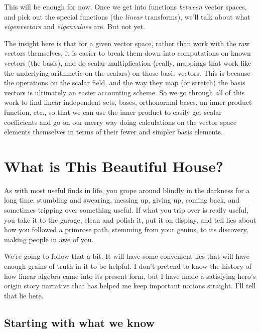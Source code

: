 \documentclass[
]{book}
\begin{document}
This will be enough for now. Once we get into functions \emph{between} vector spaces, and pick out the special functions (the \emph{linear} transforms), we'll talk about what \emph{eigenvectors} and \emph{eigenvalues} are. But not yet.

The insight here is that for a given vector space, rather than work with the raw vectors themselves, it is easier to break them down into computations on known vectors (the basis), and do scalar multiplication (really, mappings that work like the underlying arithmetic on the scalars) on those basis vectors. This is because the operations on the scalar field, and the way they map (or stretch) the basis vectors is ultimately an easier accounting scheme. So we go through all of this work to find linear independent sets, bases, orthonormal bases, an inner product function, etc., so that we can use the inner product to easily get scalar coefficients and go on our merry way doing calculations on the vector space elements themselves in terms of their fewer and simpler basis elements.

\hypertarget{what-is-this-beautiful-house}{%
\chapter{What is This Beautiful House?}\label{what-is-this-beautiful-house}}

As with most useful finds in life, you grope around blindly in the darkness for a long time, stumbling and swearing, messing up, giving up, coming back, and sometimes tripping over something useful. If what you trip over is really useful, you take it to the garage, clean and polish it, put it on display, and tell lies about how you followed a primrose path, stemming from your genius, to its discovery, making people in awe of you.

We're going to follow that a bit. It will have some convenient lies that will have enough grains of truth in it to be helpful. I don't pretend to know the history of how linear algebra came into its present form, but I have made a satisfying hero's origin story narrative that has helped me keep important notions straight. I'll tell that lie here.

\hypertarget{starting-with-what-we-know}{%
\section{Starting with what we know}\label{starting-with-what-we-know}}
\end{document}
